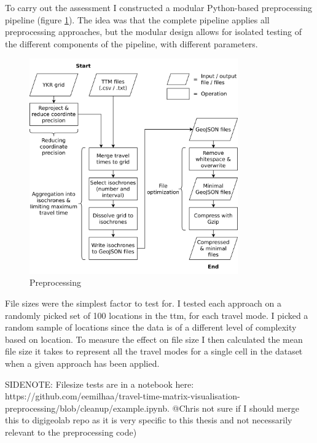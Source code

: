 To carry out the assessment
I constructed a modular Python-based preprocessing pipeline
(figure \ref{fig:preprocessing}).
The idea was that the complete pipeline applies all preprocessing approaches,
but the modular design allows for
isolated testing of the
different components of the pipeline, with different parameters.

\begin{figure}[H]
	\centering
	\includegraphics[width=0.8\textwidth]{visual/figures/diagrams/preprocessing.png}
	\caption{Preprocessing}
	\label{fig:preprocessing}
\end{figure}

File sizes were the simplest factor to test for.
I tested each approach on
a randomly picked set of 100 locations in the \acrshort{ttm},
for each travel mode.
I picked a random sample of locations since the
data is of a different level of complexity based on location.
To measure the effect on file size I then calculated the mean file size it takes to represent
all the travel modes for a single cell in the dataset
when a given approach has been applied.

SIDENOTE: Filesize tests are in a notebook here: https://github.com/eemilhaa/travel-time-matrix-visualisation-preprocessing/blob/cleanup/example.ipynb. @Chris not sure if I should merge this to digigeolab repo as it is very specific to this thesis and not necessarily relevant to the preprocessing code)

